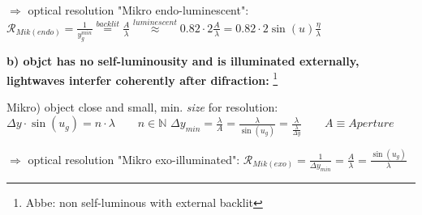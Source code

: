 $\Longrightarrow$ optical resolution "Mikro endo-luminescent":
\vspace{2ex} \newline
$
\mathscr{R}_{Mik(endo)} = \frac{1}{y_g^{min}}
\stackrel{backlit}{=}
\frac{A}{\lambda} 
\stackrel{luminescent}{\approx}
0.82 \cdot 2 \frac{A}{\lambda} = 
0.82 \cdot 2 \sin(u) \frac{\eta}{\lambda}
$
\vspace{5ex}



\noindent\textbf{b) objct has no self-luminousity and is illuminated externally, lightwaves interfer coherently after difraction:} \footnote{Abbe: non self-luminous with external backlit}
\vspace{2ex} \newline

Mikro)  object close and small, min. \textit{size} for resolution:
\vspace{2ex} \newline
$
\Delta y \cdot \sin(u_g) = n \cdot \lambda
\qquad n \in \mathbb{N}
$
\newline
$
\Delta y_{min} = \frac{\lambda}{A} = 
\frac{\lambda}{\sin(u_g)} = 
\frac{\lambda}{ \frac{\lambda}{\Delta y} }
\qquad A \equiv Aperture
$
\vspace{5ex}

$\Longrightarrow$ optical resolution "Mikro exo-illuminated":
\vspace{2ex} \newline
$
\mathscr{R}_{Mik(exo)} = 
\frac{1}{\Delta y_{min}} = 
\frac{A}{\lambda} = 
\frac{\sin(u_g)}{\lambda}
$


